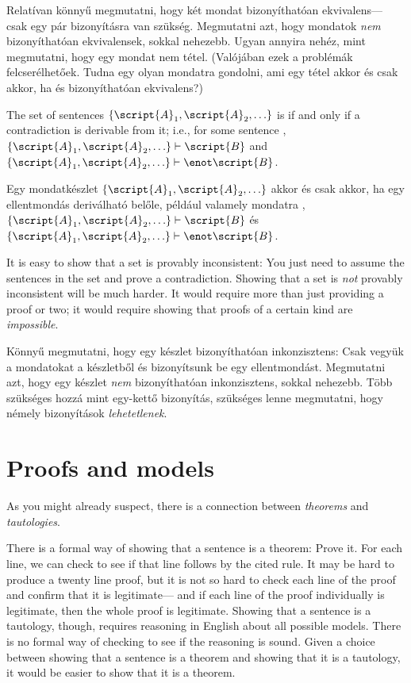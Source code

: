 Relatívan könnyű megmutatni, hogy két mondat bizonyíthatóan ekvivalens--- csak egy pár bizonyításra van szükség. Megmutatni azt, hogy mondatok \emph{nem} bizonyíthatóan ekvivalensek, sokkal nehezebb. Ugyan annyira nehéz, mint megmutatni, hogy egy mondat nem tétel. (Valójában ezek a problémák felcserélhetőek. Tudna egy olyan mondatra gondolni, ami egy tétel akkor és csak akkor, ha  és  bizonyíthatóan ekvivalens?)

The set of sentences $\{\script{A}_1,\script{A}_2,\ldots\}$ is  if and only if a contradiction is derivable from it; i.e., for some sentence , $\{\script{A}_1,\script{A}_2,\ldots\}\vdash\script{B}$ and $\{\script{A}_1,\script{A}_2,\ldots\}\vdash\enot \script{B}$.

Egy mondatkészlet $\{\script{A}_1,\script{A}_2,\ldots\}$  akkor és csak akkor, ha egy ellentmondás deriválható belőle, például valamely mondatra , $\{\script{A}_1,\script{A}_2,\ldots\}\vdash\script{B}$ és $\{\script{A}_1,\script{A}_2,\ldots\}\vdash\enot \script{B}$.

It is easy to show that a set is provably inconsistent: You just need to assume the sentences in the set and prove a contradiction. Showing that a set is \emph{not} provably inconsistent will be much harder. It would require more than just providing a proof or two; it would require showing that proofs of a certain kind are \emph{impossible}.

Könnyű megmutatni, hogy egy készlet bizonyíthatóan inkonzisztens: Csak vegyük a mondatokat a készletből és bizonyítsunk be egy ellentmondást. Megmutatni azt, hogy egy készlet \emph{nem} bizonyíthatóan inkonzisztens, sokkal nehezebb. Több szükséges hozzá mint egy-kettő bizonyítás, szükséges lenne megmutatni, hogy némely bizonyítások \emph{lehetetlenek}.






\section{Proofs and models}
As you might already suspect, there is a connection between \emph{theorems} and \emph{tautologies}.

There is a formal way of showing that a sentence is a theorem: Prove it. For each line, we can check to see if that line follows by the cited rule. It may be hard to produce a twenty line proof, but it is not so hard to check each line of the proof and confirm that it is legitimate--- and if each line of the proof individually is legitimate, then the whole proof is legitimate. Showing that a sentence is a tautology, though, requires reasoning in English about all possible models. There is no formal way of checking to see if the reasoning is sound. Given a choice between showing that a sentence is a theorem and showing that it is a tautology, it would be easier to show that it is a theorem.

